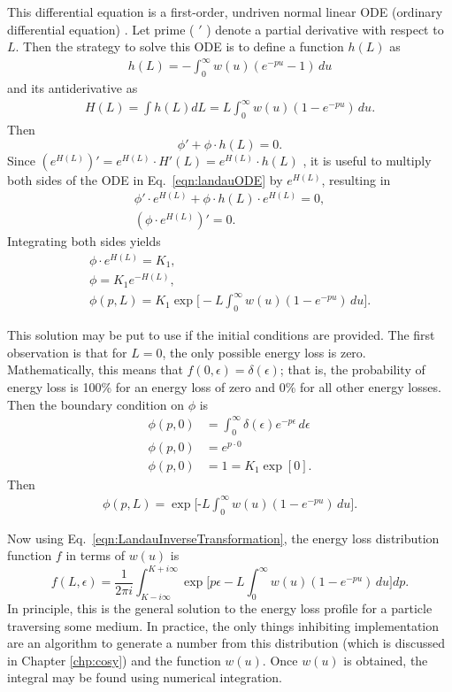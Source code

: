 This differential equation is a first-order, undriven normal linear ODE (ordinary differential equation) \cite{Borrelli}. Let prime ( $'$ ) denote a partial derivative with respect to $L$. Then the strategy to solve this ODE is to define a function $h(L)$ as
%
\begin{gather*}
h(L)=-\int_0 ^\infty w(u)  (e^{-pu}-1)\, du
\end{gather*}
and its antiderivative as
\begin{gather*}
H(L)=\int h(L) dL=L \int_0 ^\infty w(u)  (1-e^{-pu})\, du.
\end{gather*}
Then
\begin{equation}\label{eqn:landauODE}
\phi ' + \phi \cdot h(L) = 0.
\end{equation}
%
Since $(e^{H(L)}) ' = e^{H(L)}\cdot H'(L)= e^{H(L)}\cdot h(L)$ , it is useful to multiply both sides of the ODE in Eq.~\eqref{eqn:landauODE} by $e^{H(L)}$, resulting in
\begin{gather*}
\phi ' \cdot e^{H(L)}+ \phi \cdot h(L) \cdot e^{H(L)} = 0,\\
(\phi\cdot e^{H(L)}) ' = 0.
\end{gather*}
Integrating both sides yields
\begin{gather*}
\phi\cdot e^{H(L)}=K_1,\\
\phi = K_1 e^{-H(L)},\\
\phi(p,L)=K_1 \exp\Big[-L\int_0 ^\infty w(u)  (1-e^{-pu})\, du\Big].
\end{gather*}

This solution may be put to use if the initial conditions are provided. The first observation is that for $L=0$, the only possible energy loss is zero. Mathematically, this means that $f(0,\epsilon)=\delta(\epsilon)$; that is, the probability of energy loss is 100\% for an energy loss of zero and 0\% for all other energy losses. Then the boundary condition on $\phi$ is
\begin{align}
\phi(p,0)&=\int_0 ^\infty \delta(\epsilon) e^{-p\epsilon}\, d\epsilon\nonumber\\
\phi(p,0)&=e^{p\cdot 0}\nonumber\\
\phi(p,0)&=1=K_1\exp[0].\nonumber%
\end{align}
Then
\begin{gather*}
\phi(p,L)=\exp\Big[\textrm{-}L\int_0 ^\infty w(u)  (1-e^{-pu})\, du\Big].
\end{gather*}

Now using Eq.~\eqref{eqn:LandauInverseTransformation}, the energy loss distribution function $f$ in terms of $w(u)$ is 
\begin{equation} \label{eqn:LandauGeneralSolution}
f(L,\epsilon)=\frac{1}{2\pi i} \int_{K-i\infty} ^{K+i\infty} \exp\Big[p\epsilon-L\int_0 ^\infty w(u)  (1-e^{-pu})\, du\Big] dp.
\end{equation}
In principle, this is the general solution to the energy loss profile for a particle traversing some medium. In practice, the only things inhibiting implementation are an algorithm to generate a number from this distribution (which is discussed in Chapter \ref{chp:cosy}) and the function $w(u)$. Once $w(u)$ is obtained, the integral may be found using numerical integration.


